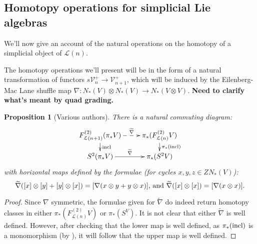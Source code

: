 \documentclass[11pt]{amsart}
\theoremstyle{plain}
\newtheorem{prop}[thm]{Proposition}
\theoremstyle{definition}
\renewcommand{\to}{\longrightarrow}
\newcommand{\calL}{\mathcal{L}}
\newcommand{\calV}{\mathcal{V}}
\theoremstyle{plain}
\newcommand{\vect}[2]{\calV^{#1}_{#2}}
\begin{document}
\begin{Lie algebras in characteristic 2 and their homotopy operations}
\subsection{Homotopy operations for simplicial Lie algebras}
We'll now give an account of the natural operations on the homotopy of a simplicial object of $\calL(n)$.

The homotopy operations we'll present will be in the form of a natural transformation of functors $s\vect{+}{n}\to \vect{+}{n+1}$, which will be induced by the Eilenberg-Mac Lane shuffle map $\nabla:N_*(V)\otimes N_*(V)\to N_*(V\otimes V)$. \textbf{Need to clarify what's meant by quad grading.}
\begin{prop}[Various authors]\label{the top homotopy operations for Lie algebras}
There is a natural commuting diagram:
\[\xymatrix@R=4mm{
F^{(2)}_{\calL(n+1)}(\pi_*V)\ar@{-->}[r]^-{\widetilde{\nabla}}
\ar[d]^-{\textup{incl}}
&%
\pi_*(F^{(2)}_{\calL(n)}V)\ar[d]^-{\pi_*(\textup{incl})}
\\%
S^2(\pi_*V)\ar[r]^-{\widetilde{\nabla}}&%
\pi_*(S^2V)%
}\]
with horizontal maps defined by the formulae (for cycles $x,y,z\in ZN_*(V)$):
\[\widetilde{\nabla}([x]\otimes[y]+[y]\otimes [x])=[\nabla(x\otimes y+y\otimes x)]\textup{, and }\widetilde{\nabla}([x]\otimes[x])=[\nabla(x\otimes x)].\]
\end{prop}
\begin{proof}
Since $\nabla$ symmetric, the formulae given for $\widetilde{\nabla}$ do indeed return homotopy classes in either $\pi_*(F^{(2)}_{\calL(n)}V)$ or $\pi_*(S^V)$. It is not clear that either $\widetilde{\nabla}$ is well defined. However, after checking that the lower map is well defined, as $\pi_*(\textup{incl})$ is a monomorphism (by \cite[Prop 5.6]{BousOpnsDerFun.pdf}), it will follow that the upper map is well defined. 

\end{proof}
\end{Lie algebras in characteristic 2 and their homotopy operations}
\end{document}
